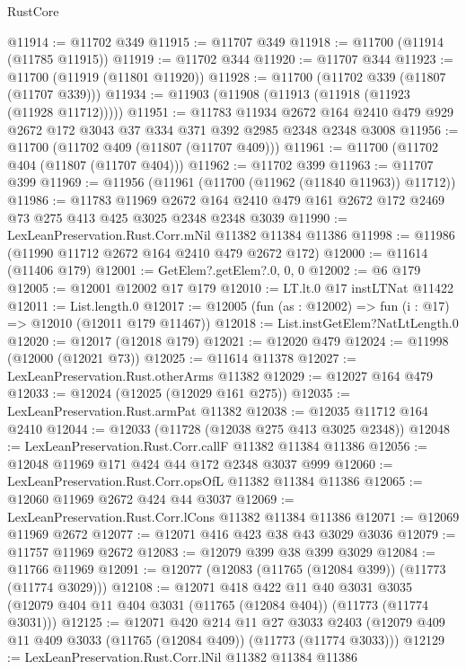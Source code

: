 \begin{lexlean}{RustCore}
\begin{coremodule}
@11914 := @11702 @349
@11915 := @11707 @349
@11918 := @11700 (@11914 (@11785 @11915))
@11919 := @11702 @344
@11920 := @11707 @344
@11923 := @11700 (@11919 (@11801 @11920))
@11928 := @11700 (@11702 @339 (@11807 (@11707 @339)))
@11934 := @11903 (@11908 (@11913 (@11918 (@11923 (@11928 @11712)))))
@11951 := @11783
    @11934
    @2672
    @164
    @2410
    @479
    @929
    @2672
    @172
    @3043
    @37
    @334
    @371
    @392
    @2985
    @2348
    @2348
    @3008
@11956 := @11700 (@11702 @409 (@11807 (@11707 @409)))
@11961 := @11700 (@11702 @404 (@11807 (@11707 @404)))
@11962 := @11702 @399
@11963 := @11707 @399
@11969 := @11956 (@11961 (@11700 (@11962 (@11840 @11963)) @11712))
@11986 := @11783
    @11969
    @2672
    @164
    @2410
    @479
    @161
    @2672
    @172
    @2469
    @73
    @275
    @413
    @425
    @3025
    @2348
    @2348
    @3039
@11990 := LexLeanPreservation.Rust.Corr.mNil @11382 @11384 @11386
@11998 := @11986 (@11990 @11712 @2672 @164 @2410 @479 @2672 @172)
@12000 := @11614 (@11406 @179)
@12001 := GetElem?.getElem?.{0, 0, 0}
@12002 := @6 @179
@12005 := @12001 @12002 @17 @179
@12010 := LT.lt.{0} @17 instLTNat @11422
@12011 := List.length.{0}
@12017 := @12005 (fun (as : @12002) => fun (i : @17) => @12010 (@12011 @179 @11467))
@12018 := List.instGetElem?NatLtLength.{0}
@12020 := @12017 (@12018 @179)
@12021 := @12020 @479
@12024 := @11998 (@12000 (@12021 @73))
@12025 := @11614 @11378
@12027 := LexLeanPreservation.Rust.otherArms @11382
@12029 := @12027 @164 @479
@12033 := @12024 (@12025 (@12029 @161 @275))
@12035 := LexLeanPreservation.Rust.armPat @11382
@12038 := @12035 @11712 @164 @2410
@12044 := @12033 (@11728 (@12038 @275 @413 @3025 @2348))
@12048 := LexLeanPreservation.Rust.Corr.callF @11382 @11384 @11386
@12056 := @12048 @11969 @171 @424 @44 @172 @2348 @3037 @999
@12060 := LexLeanPreservation.Rust.Corr.opsOfL @11382 @11384 @11386
@12065 := @12060 @11969 @2672 @424 @44 @3037
@12069 := LexLeanPreservation.Rust.Corr.lCons @11382 @11384 @11386
@12071 := @12069 @11969 @2672
@12077 := @12071 @416 @423 @38 @43 @3029 @3036
@12079 := @11757 @11969 @2672
@12083 := @12079 @399 @38 @399 @3029
@12084 := @11766 @11969
@12091 := @12077 (@12083 (@11765 (@12084 @399)) (@11773 (@11774 @3029)))
@12108 := @12071
    @418
    @422
    @11
    @40
    @3031
    @3035
    (@12079 @404 @11 @404 @3031 (@11765 (@12084 @404)) (@11773 (@11774 @3031)))
@12125 := @12071
    @420
    @214
    @11
    @27
    @3033
    @2403
    (@12079 @409 @11 @409 @3033 (@11765 (@12084 @409)) (@11773 (@11774 @3033)))
@12129 := LexLeanPreservation.Rust.Corr.lNil @11382 @11384 @11386

\end{coremodule}
\end{lexlean}
